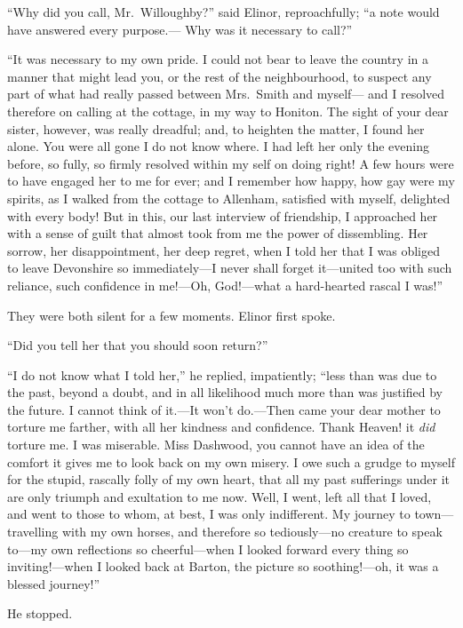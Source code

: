 ``Why did you call, Mr.\ Willoughby?'' said Elinor,
reproachfully; ``a note would have answered every purpose.---%
Why was it necessary to call?''

``It was necessary to my own pride.  I could not bear
to leave the country in a manner that might lead you,
or the rest of the neighbourhood, to suspect any part
of what had really passed between Mrs.\ Smith and myself---%
and I resolved therefore on calling at the cottage,
in my way to Honiton.  The sight of your dear sister,
however, was really dreadful; and, to heighten the matter,
I found her alone.  You were all gone I do not know where.
I had left her only the evening before, so fully,
so firmly resolved within my self on doing right!
A few hours were to have engaged her to me for ever;
and I remember how happy, how gay were my spirits, as I
walked from the cottage to Allenham, satisfied with myself,
delighted with every body!  But in this, our last interview
of friendship, I approached her with a sense of guilt
that almost took from me the power of dissembling.
Her sorrow, her disappointment, her deep regret, when I told
her that I was obliged to leave Devonshire so immediately---I
never shall forget it---united too with such reliance,
such confidence in me!---Oh, God!---what a hard-hearted
rascal I was!''

They were both silent for a few moments.
Elinor first spoke.

``Did you tell her that you should soon return?''

``I do not know what I told her,'' he replied, impatiently;
``less than was due to the past, beyond a doubt, and in all
likelihood much more than was justified by the future.
I cannot think of it.---It won't do.---Then came your dear mother
to torture me farther, with all her kindness and confidence.
Thank Heaven! it \emph{did} torture me.  I was miserable.
Miss Dashwood, you cannot have an idea of the comfort it
gives me to look back on my own misery.  I owe such a grudge
to myself for the stupid, rascally folly of my own heart,
that all my past sufferings under it are only triumph and
exultation to me now.  Well, I went, left all that I loved,
and went to those to whom, at best, I was only indifferent.
My journey to town---travelling with my own horses,
and therefore so tediously---no creature to speak to---my
own reflections so cheerful---when I looked forward
every thing so inviting!---when I looked back at Barton,
the picture so soothing!---oh, it was a blessed journey!''

He stopped.

